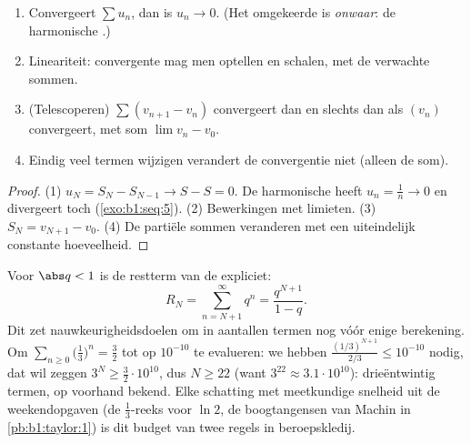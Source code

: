 \begin{proposition}\label{prop:b1:series:first}
\begin{enumerate}
  \item Convergeert $\sum u_n$, dan is $u_n \to 0$. (Het omgekeerde
        is \emph{onwaar}: de harmonische .)
  \item Lineariteit: convergente  mag men optellen en
        schalen, met de verwachte sommen.
  \item (Telescoperen) $\sum (v_{n+1} -
        v_n)$ convergeert dan en slechts dan als $(v_n)$
        convergeert, met som $\lim v_n - v_0$.
  \item Eindig veel termen wijzigen verandert de convergentie niet
        (alleen de som).
\end{enumerate}
\end{proposition}

\begin{proof}
(1) $u_N = S_N - S_{N-1} \to S - S = 0$. De harmonische  heeft
$u_n = \frac1n \to 0$ en divergeert toch (\cref{exo:b1:seq:5}). (2)
Bewerkingen met limieten. (3) $S_N = v_{N+1} - v_0$. (4) De partiële
sommen veranderen met een uiteindelijk constante hoeveelheid.
\end{proof}

\begin{example}\label{ex:b1:series:georemainder}
Voor $\abs q < 1$ is de restterm van de 
expliciet:
\[
R_N = \sum_{n = N+1}^{\infty} q^n = \frac{q^{N+1}}{1 - q} .
\]
Dit zet nauwkeurigheidsdoelen om in aantallen termen nog vóór
enige berekening. Om $\sum_{n\geq0} \bigl(\frac13\bigr)^n =
\frac32$ tot op $10^{-10}$ te evalueren: we hebben
$\frac{(1/3)^{N+1}}{2/3} \leq 10^{-10}$ nodig, dat wil zeggen
$3^{N} \geq \frac{3}{2}\cdot 10^{10}$, dus $N \geq 22$ (want
$3^{22} \approx 3.1\cdot10^{10}$): drieëntwintig termen, op
voorhand bekend. Elke schatting met meetkundige snelheid uit de
weekendopgaven (de $\frac13$-reeks voor $\ln 2$, de boogtangensen
van Machin in \cref{pb:b1:taylor:1}) is dit budget van twee
regels in beroepskledij.
\end{example}

